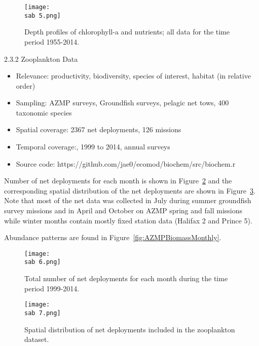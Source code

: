 \documentclass[letterpaper,portrait,11pt]{scrartcl}
\numberwithin{equation}{section}		%
\numberwithin{figure}{section}			%
\numberwithin{table}{section}				%
\newcommand{\ecomod}{\string~/ecomod_data/}   %
\newcommand{\sab}{\ecomod/mpa/sab/}   %
\begin{document}
\begin{figure}
  \label{fig:ChloroProfiles}
  \centering
  \texttt{[image: \\sab 5.png]}
  \caption{Depth profiles of chlorophyll-a and nutrients; all data for the time period 1955-2014.}
\end{figure}


2.3.2  Zooplankton Data

\begin{itemize}  
  \item Relevance:  productivity, biodiversity, species of interest, habitat (in relative order)
  \item Sampling:  AZMP surveys, Groundfish surveys, pelagic net tows, 400 taxonomic species
  \item Spatial coverage: 2367 net deployments, 126 missions 
  \item Temporal coverage:,  1999 to 2014, annual surveys
  \item Source code: https://github.com/jae0/ecomod/biochem/src/biochem.r
\end{itemize}

Number of net deployments for each month is shown in Figure~\ref{fig:AZMPdeploymentsMonthly} and the corresponding spatial distribution of the net deployments are shown in Figure~\ref{fig:AZMPdeploymentsMonthlyMap}. Note that most of the net data was collected in July during summer groundfish survey missions and in April and October on AZMP spring and fall missions while winter months contain mostly fixed station data (Halifax 2 and Prince 5).

Abundance patterns are found in Figure~\ref{fig:AZMPBiomassMonthly}.

\begin{figure}[h]
  \label{fig:AZMPdeploymentsMonthly}
  \centering
  \texttt{[image: \\sab 6.png]}
  \caption{Total number of net deployments for each month during the time period 1999-2014.}
\end{figure}

\begin{figure}[h]
  \label{fig:AZMPdeploymentsMonthlyMap}
  \centering
  \texttt{[image: \\sab 7.png]}
  \caption{Spatial distribution of net deployments included in the zooplankton dataset. }
\end{figure}
\end{document}
